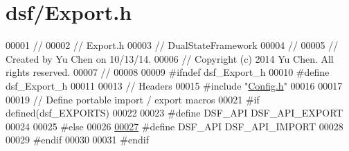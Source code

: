 \hypertarget{dsf_2_export_8h_source}{}\section{dsf/\+Export.h}
\label{dsf_2_export_8h_source}

\begin{DoxyCode}
00001 \textcolor{comment}{//}
00002 \textcolor{comment}{//  Export.h}
00003 \textcolor{comment}{//  DualStateFramework}
00004 \textcolor{comment}{//}
00005 \textcolor{comment}{//  Created by Yu Chen on 10/13/14.}
00006 \textcolor{comment}{//  Copyright (c) 2014 Yu Chen. All rights reserved.}
00007 \textcolor{comment}{//}
00008 
00009 \textcolor{preprocessor}{#ifndef dsf\_Export\_h}
00010 \textcolor{preprocessor}{#define dsf\_Export\_h}
00011 
00013 \textcolor{comment}{// Headers}
00015 \textcolor{comment}{}\textcolor{preprocessor}{#include "\hyperlink{dsf_2_config_8h}{Config.h}"}
00016 
00017 
00019 \textcolor{comment}{// Define portable import / export macros}
00021 \textcolor{comment}{}\textcolor{preprocessor}{#if defined(dsf\_EXPORTS)}
00022 
00023 \textcolor{preprocessor}{#define DSF\_API DSF\_API\_EXPORT}
00024 
00025 \textcolor{preprocessor}{#else}
00026 
\hypertarget{dsf_2_export_8h_source_l00027}{}\hyperlink{dsf_2_export_8h_ad7bb940831423512f29a6981786c37bd}{00027} \textcolor{preprocessor}{#define DSF\_API DSF\_API\_IMPORT}
00028 
00029 \textcolor{preprocessor}{#endif}
00030 
00031 \textcolor{preprocessor}{#endif}
\end{DoxyCode}
